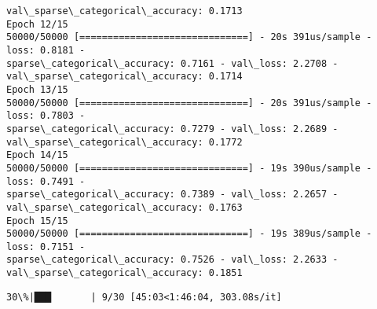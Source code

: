 \documentclass[11pt]{article}
\begin{document}
\begin{Verbatim}[commandchars=\\\{\}]
val\_sparse\_categorical\_accuracy: 0.1713
Epoch 12/15
50000/50000 [==============================] - 20s 391us/sample - loss: 0.8181 -
sparse\_categorical\_accuracy: 0.7161 - val\_loss: 2.2708 -
val\_sparse\_categorical\_accuracy: 0.1714
Epoch 13/15
50000/50000 [==============================] - 20s 391us/sample - loss: 0.7803 -
sparse\_categorical\_accuracy: 0.7279 - val\_loss: 2.2689 -
val\_sparse\_categorical\_accuracy: 0.1772
Epoch 14/15
50000/50000 [==============================] - 19s 390us/sample - loss: 0.7491 -
sparse\_categorical\_accuracy: 0.7389 - val\_loss: 2.2657 -
val\_sparse\_categorical\_accuracy: 0.1763
Epoch 15/15
50000/50000 [==============================] - 19s 389us/sample - loss: 0.7151 -
sparse\_categorical\_accuracy: 0.7526 - val\_loss: 2.2633 -
val\_sparse\_categorical\_accuracy: 0.1851
    \end{Verbatim}

    \begin{Verbatim}[commandchars=\\\{\}]
 30\%|███       | 9/30 [45:03<1:46:04, 303.08s/it]
    \end{Verbatim}
\end{document}
